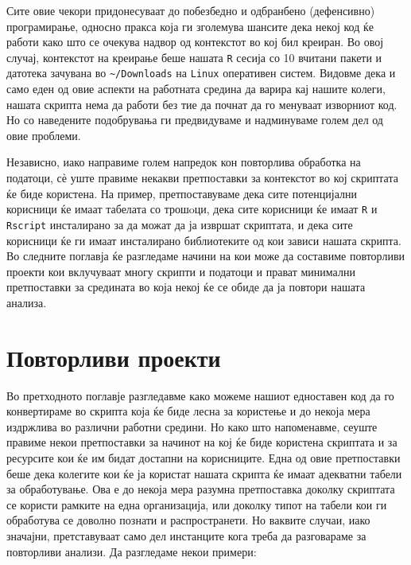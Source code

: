\documentclass[
]{book}
\begin{document}
Сите овие чекори придонесуваат до побезбедно и одбранбено (дефенсивно) програмирање, односно пракса која ги зголемува шансите дека некој код ќе работи како што се очекува надвор од контекстот во кој бил креиран. Во овој случај, контекстот на креирање беше нашата \texttt{R} сесија со 10 вчитани пакети и датотека зачувана во \texttt{\textasciitilde{}/Downloads} на \texttt{Linux} оперативен систем. Видовме дека и само еден од овие аспекти на работната средина да варира кај нашите колеги, нашата скрипта нема да работи без тие да почнат да го менуваат изворниот код. Но со наведените подобрувања ги предвидуваме и надминуваме голем дел од овие проблеми.

Независно, иако направиме голем напредок кон повторлива обработка на податоци, сѐ уште правиме некакви претпоставки за контекстот во кој скриптата ќе биде користена. На пример, претпоставуваме дека сите потенцијални корисници ќе имаат табелата со трошoци, дека сите корисници ќе имаат \texttt{R} и \texttt{Rscript} инсталирано за да можат да ја извршат скриптата, и дека сите корисници ќе ги имаат инсталирано библиотеките од кои зависи нашата скрипта. Во следните поглавја ќе разгледаме начини на кои може да составиме повторливи проекти кои вклучуваат многу скрипти и податоци и прават минимални претпоставки за средината во која некој ќе се обиде да ја повтори нашата анализа.

\hypertarget{ux43fux43eux432ux442ux43eux440ux43bux438ux432ux438-ux43fux440ux43eux435ux43aux442ux438}{%
\chapter{Повторливи проекти}\label{ux43fux43eux432ux442ux43eux440ux43bux438ux432ux438-ux43fux440ux43eux435ux43aux442ux438}}

Во претходното поглавје разгледавме како можеме нашиот едноставен код да го конвертираме во скрипта која ќе биде лесна за користење и до некоја мера издржлива во различни работни средини. Но како што напоменавме, сеуште правиме некои претпоставки за начинот на кој ќе биде користена скриптата и за ресурсите кои ќе им бидат достапни на корисниците. Една од овие претпоставки беше дека колегите кои ќе ја користат нашата скрипта ќе имаат адекватни табели за обработување. Ова е до некоја мера разумна претпоставка доколку скриптата се користи рамките на една организација, или доколку типот на табели кои ги обработува се доволно познати и распространети. Но ваквите случаи, иако значајни, претставуваат само дел инстанците кога треба да разговараме за повторливи анализи. Да разгледаме некои примери:
\end{document}
